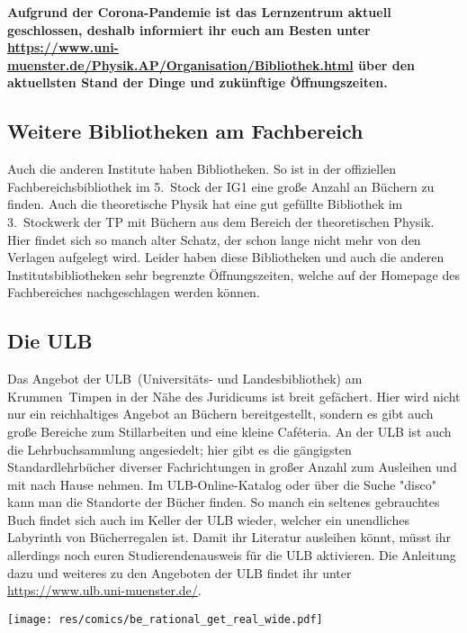 \begin{multicols*}{2}
\textbf{Aufgrund der Corona-Pandemie ist das Lernzentrum aktuell geschlossen, deshalb informiert ihr euch am Besten unter \url{https://www.uni-muenster.de/Physik.AP/Organisation/Bibliothek.html} über den aktuellsten Stand der Dinge und zukünftige Öffnungszeiten.}

\begin{center}
\end{center}

\subsection{Weitere Bibliotheken am Fachbereich}
Auch die anderen Institute haben Bibliotheken.
So ist in der offiziellen Fachbereichsbibliothek im 5.~Stock der IG1 eine große Anzahl an Büchern zu finden.
Auch die theoretische Physik hat eine gut gefüllte Bibliothek im 3.~Stockwerk der TP mit Büchern aus dem Bereich der theoretischen Physik.
Hier findet sich so manch alter Schatz, der schon lange nicht mehr von den Verlagen aufgelegt wird.
Leider haben diese Bibliotheken und auch die anderen Institutsbibliotheken sehr begrenzte Öffnungszeiten, welche auf der Homepage des Fachbereiches nachgeschlagen werden können.


\subsection{Die ULB}
Das Angebot der ULB~(Universitäts- und Landesbibliothek) am Krummen~Timpen in der Nähe des Juridicums ist breit gefächert.
Hier wird nicht nur ein reichhaltiges Angebot an Büchern bereitgestellt, sondern es gibt auch große Bereiche zum Stillarbeiten und eine kleine Caféteria.
An der ULB ist auch die Lehrbuchsammlung angesiedelt; hier gibt es die gängigsten Standardlehrbücher diverser Fachrichtungen in großer Anzahl zum Ausleihen und mit nach Hause nehmen.
Im ULB-Online-Katalog oder über die Suche "disco" kann man die Standorte der Bücher finden.
So manch ein seltenes gebrauchtes Buch findet sich auch im Keller der ULB wieder, welcher ein unendliches Labyrinth von Bücherregalen ist.
Damit ihr Literatur ausleihen könnt, müsst ihr allerdings noch euren Studierendenausweis für die ULB aktivieren. Die Anleitung dazu und weiteres zu den Angeboten der ULB findet ihr unter \url{https://www.ulb.uni-muenster.de/}.


\begin{center}
	\texttt{[image: res/comics/be\_rational\_get\_real\_wide.pdf]}
\end{center}

\end{multicols*}
